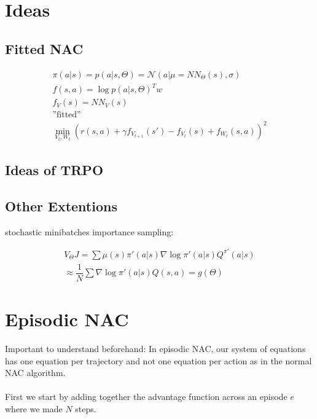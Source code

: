 
\section{Ideas}
\subsection{Fitted NAC}

\begin{align}
	\pi(a|s) = p(a|s, \Theta) = \mathcal{N}(a|\mu = NN_{\Theta}(s), \sigma) \\
	f(s,a) = \log p(a|s, \Theta)^T w \\
	f_V(s) = NN_V(s) \\
	\text{''fitted''}\\
	\min_{V_t, W_t} (r(s,a) + \gamma f_{V_{t+1}}(s') - f_{V_t}(s) + f_{W_t}(s,a))^2
\end{align}



\subsection{Ideas of TRPO}


\subsection{Other Extentions}

\begin{itemize}
	\x stochastic
	\x minibatches
	\x importance sampling:
\end{itemize}

\begin{align}
	V_{\Theta} J = \sum \mu(s) \pi'(a|s) \nabla \log \pi'(a|s) Q^{\pi'}(a|s) \\
	\approx \dfrac{1}{N} \sum \nabla \log \pi'(a|s) Q(s,a) = g(\Theta)
\end{align}





\section{Episodic NAC}
Important to understand beforehand: In episodic NAC, our system of equations has one equation per trajectory and not one equation per action as in the normal NAC algorithm.
\\\\
First we start by adding together the advantage function across an episode $e$ where we made $N$ steps.

